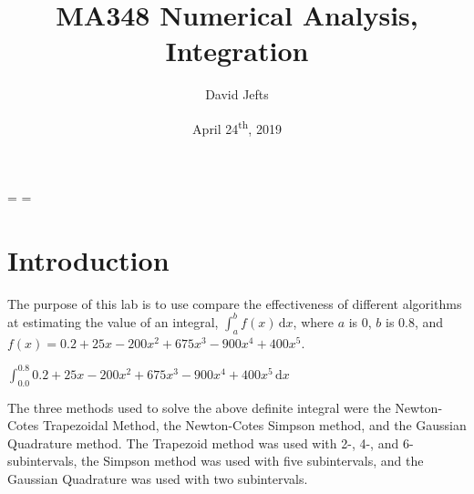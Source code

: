 \documentclass[12pt, letterpaper]{article}
\begin{document}
\setcounter{secnumdepth}{-1}
\binoppenalty=\maxdimen
\relpenalty=\maxdimen

\setlength{\abovedisplayskip}{-0.5\baselineskip}
\setlength{\belowdisplayskip}{0\baselineskip}
\setlength{\abovedisplayshortskip}{0\baselineskip}
\setlength{\belowdisplayshortskip}{0\baselineskip}

\title{MA348 Numerical Analysis, Integration}
\author{David Jefts}
\date{April 24\textsuperscript{th}, 2019}
\begin{titlepage}
	\centering
	\maketitle
	\centering
	\hfill
	\vfill
	\thispagestyle{empty}
\end{titlepage}

\setlength{\voffset}{-0.5in}
\setlength{\headsep}{10pt}

\section{\label{sec:intro}Introduction}
	The purpose of this lab is to use compare the effectiveness of different algorithms at estimating the value of an integral, $\displaystyle\int_{a}^{b}\!{f(x)}\,\mathrm{d}x$, where $a$ is 0, $b$ is 0.8, and $f(x)={0.2+25x-200x^2+675x^3-900x^4+400x^5}$.
	
	$\displaystyle\int_{0.0}^{0.8}\!{0.2+25x-200x^2+675x^3-900x^4+400x^5}\,\mathrm{d}x$
	 
	 The three methods used to solve the above definite integral were the Newton-Cotes Trapezoidal Method, the Newton-Cotes Simpson method, and the Gaussian Quadrature method. The Trapezoid method was used with 2-, 4-, and 6-subintervals, the Simpson method was used with five subintervals, and the Gaussian Quadrature was used with two subintervals.

\end{document}
